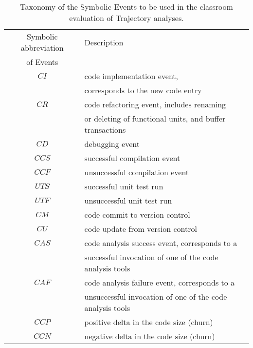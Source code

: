 \begin{table}
\begin{center}
    \begin{tabular}{ | c | l | }
    \hline
    Symbolic abbreviation & Description \\ 
     of Events 						& 	  \\ 
    \hline
    $CI$                  & code implementation event, \\
    											& corresponds to the new code entry \\
    \hline    											
    $CR$                  & code refactoring event, includes renaming \\
    											& or deleting of functional units, and buffer transactions \\
    \hline
    $CD$                  & debugging event \\
		\hline
		$CCS$                 & successful compilation event \\
		\hline
		$CCF$                 & unsuccessful compilation event \\
    \hline
		$UTS$                 & successful unit test run \\
		\hline
		$UTF$                 & unsuccessful unit test run \\
		\hline
		$CM$                  & code commit to version control \\
		\hline
		$CU$                  & code update from version control \\
		\hline
    $CAS$                 & code analysis success event, corresponds to a \\
                          & successful invocation of one of the code analysis tools \\
    \hline
		$CAF$                 & code analysis failure event, corresponds to a \\
                          & unsuccessful invocation of one of the code analysis tools \\
    \hline    
    $CCP$                 & positive delta in the code size (churn) \\
    \hline
    $CCN$                 & negative delta in the code size (churn) \\
    \hline
    \end{tabular}
    \caption{Taxonomy of the Symbolic Events to be used in the classroom evaluation of Trajectory analyses.}
    \label{fig:data_collected_points}
    \end{center}
\end{table}

